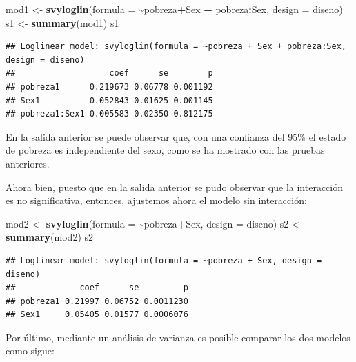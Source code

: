 \documentclass[
  12pt,
]{book}
\newenvironment{Shaded}{\begin{snugshade}}{\end{snugshade}}
\newcommand{\AttributeTok}[1]{\textcolor[rgb]{0.13,0.29,0.53}{#1}}
\newcommand{\FunctionTok}[1]{\textcolor[rgb]{0.13,0.29,0.53}{\textbf{#1}}}
\newcommand{\NormalTok}[1]{#1}
\newcommand{\OtherTok}[1]{\textcolor[rgb]{0.56,0.35,0.01}{#1}}
\newcommand{\SpecialCharTok}[1]{\textcolor[rgb]{0.81,0.36,0.00}{\textbf{#1}}}
\begin{document}
\begin{Shaded}
\begin{Highlighting}[]
\NormalTok{mod1 }\OtherTok{\textless{}{-}} \FunctionTok{svyloglin}\NormalTok{(}\AttributeTok{formula =} \SpecialCharTok{\textasciitilde{}}\NormalTok{pobreza}\SpecialCharTok{+}\NormalTok{Sex }\SpecialCharTok{+}\NormalTok{ pobreza}\SpecialCharTok{:}\NormalTok{Sex, }
                    \AttributeTok{design =}\NormalTok{ diseno)}
\NormalTok{s1 }\OtherTok{\textless{}{-}} \FunctionTok{summary}\NormalTok{(mod1)}
\NormalTok{s1}
\end{Highlighting}
\end{Shaded}

\begin{verbatim}
## Loglinear model: svyloglin(formula = ~pobreza + Sex + pobreza:Sex, design = diseno)
##                   coef      se        p
## pobreza1      0.219673 0.06778 0.001192
## Sex1          0.052843 0.01625 0.001145
## pobreza1:Sex1 0.005583 0.02350 0.812175
\end{verbatim}

En la salida anterior se puede observar que, con una confianza del 95\% el estado de pobreza es independiente del sexo, como se ha mostrado con las pruebas anteriores.

Ahora bien, puesto que en la salida anterior se pudo observar que la interacción es no significativa, entonces, ajustemos ahora el modelo sin interacción:

\begin{Shaded}
\begin{Highlighting}[]
\NormalTok{mod2 }\OtherTok{\textless{}{-}} \FunctionTok{svyloglin}\NormalTok{(}\AttributeTok{formula =} \SpecialCharTok{\textasciitilde{}}\NormalTok{pobreza}\SpecialCharTok{+}\NormalTok{Sex, }
                  \AttributeTok{design =}\NormalTok{ diseno)}
\NormalTok{s2 }\OtherTok{\textless{}{-}} \FunctionTok{summary}\NormalTok{(mod2)}
\NormalTok{s2}
\end{Highlighting}
\end{Shaded}

\begin{verbatim}
## Loglinear model: svyloglin(formula = ~pobreza + Sex, design = diseno)
##             coef      se         p
## pobreza1 0.21997 0.06752 0.0011230
## Sex1     0.05405 0.01577 0.0006076
\end{verbatim}

Por último, mediante un análisis de varianza es posible comparar los dos modelos como sigue:
\end{document}
